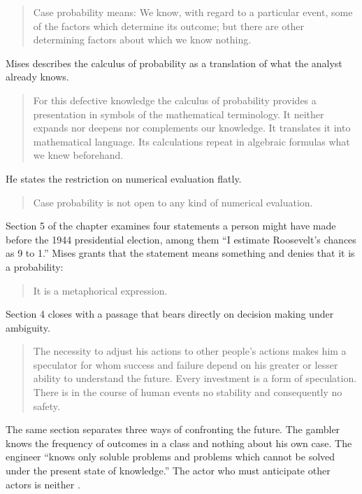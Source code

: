 \documentclass[12pt]{article}
\begin{document}
\begin{quote}
Case probability means: We know, with regard to a particular event, some of the
factors which determine its outcome; but there are other determining factors
about which we know nothing.
\hfill \citep[p.~110]{Mises1998HumanAction}
\end{quote}

Mises describes the calculus of probability as a translation of what the
analyst already knows.

\begin{quote}
For this defective knowledge the calculus of probability provides a
presentation in symbols of the mathematical terminology.  It neither expands
nor deepens nor complements our knowledge.  It translates it into mathematical
language.  Its calculations repeat in algebraic formulas what we knew
beforehand.
\hfill \citep[p.~108]{Mises1998HumanAction}
\end{quote}

He states the restriction on numerical evaluation flatly.

\begin{quote}
Case probability is not open to any kind of numerical evaluation.
\hfill \citep[p.~113]{Mises1998HumanAction}
\end{quote}

Section 5 of the chapter examines four statements a person might have made
before the 1944 presidential election, among them ``I estimate Roosevelt's
chances as 9 to 1.''  Mises grants that the statement means something and
denies that it is a probability:

\begin{quote}
It is a metaphorical expression.
\hfill \citep[p.~114]{Mises1998HumanAction}
\end{quote}

Section 4 closes with a passage that bears directly on decision making under
ambiguity.

\begin{quote}
The necessity to adjust his actions to other people's actions makes him a
speculator for whom success and failure depend on his greater or lesser ability
to understand the future.  Every investment is a form of speculation.  There is
in the course of human events no stability and consequently no safety.
\hfill \citep[p.~113]{Mises1998HumanAction}
\end{quote}

The same section separates three ways of confronting the future.  The gambler
knows the frequency of outcomes in a class and nothing about his own case.  The
engineer ``knows only soluble problems and problems which cannot be solved
under the present state of knowledge.''  The actor who must anticipate other
actors is neither \citep[p.~112]{Mises1998HumanAction}.
\end{document}
